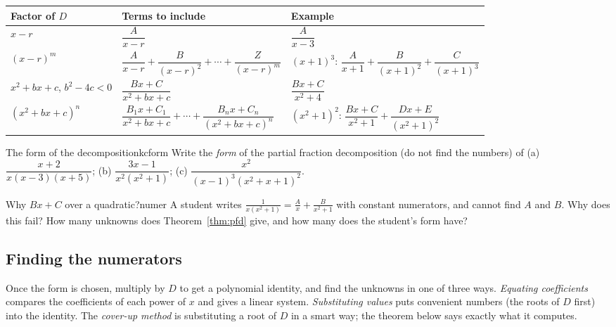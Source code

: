 \documentclass[11pt]{article}
\begin{document}
\begin{center}\small\renewcommand{\arraystretch}{1.3}
\begin{tabular}{p{}p{}p{}}
\textbf{Factor of $D$} & \textbf{Terms to include} & \textbf{Example}\\ \hline
$x-r$ & $\dfrac A{x-r}$ & $\dfrac{A}{x-3}$\\
$(x-r)^m$ & $\dfrac A{x-r}+\dfrac B{(x-r)^2}+\cdots+\dfrac Z{(x-r)^m}$ & $(x+1)^3$: $\dfrac A{x+1}+\dfrac B{(x+1)^2}+\dfrac C{(x+1)^3}$\\
$x^2+bx+c$, $b^2-4c<0$ & $\dfrac{Bx+C}{x^2+bx+c}$ & $\dfrac{Bx+C}{x^2+4}$\\
$(x^2+bx+c)^n$ & $\dfrac{B_1x+C_1}{x^2+bx+c}+\cdots+\dfrac{B_nx+C_n}{(x^2+bx+c)^n}$ & $(x^2+1)^2$: $\dfrac{Bx+C}{x^2+1}+\dfrac{Dx+E}{(x^2+1)^2}$\\
\end{tabular}
\end{center}

\begin{kc}{The form of the decomposition}{kcform}
Write the \emph{form} of the partial fraction decomposition (do not find the numbers) of (a) $\dfrac{x+2}{x(x-3)(x+5)}$; (b) $\dfrac{3x-1}{x^2(x^2+1)}$; (c) $\dfrac{x^2}{(x-1)^3(x^2+x+1)^2}$.
\end{kc}

\begin{think}{Why $Bx+C$ over a quadratic?}{numer}
A student writes $\frac{1}{x(x^2+1)}=\frac Ax+\frac B{x^2+1}$ with constant numerators, and cannot find $A$ and $B$. Why does this fail? How many unknowns does Theorem~\ref{thm:pfd} give, and how many does the student's form have?
\end{think}

\subsection*{Finding the numerators}

Once the form is chosen, multiply by $D$ to get a polynomial identity, and find the unknowns in one of three ways. \emph{Equating coefficients} compares the coefficients of each power of $x$ and gives a linear system. \emph{Substituting values} puts convenient numbers (the roots of $D$ first) into the identity. The \emph{cover-up method} is substituting a root of $D$ in a smart way; the theorem below says exactly what it computes.
\end{document}
